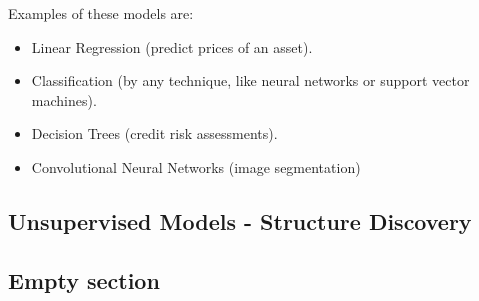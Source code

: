 Examples of these models are:
\begin{itemize}
    \item Linear Regression (predict prices of an asset).
    \item Classification (by any technique, like neural networks or support vector machines).
    \item Decision Trees (credit risk assessments).
    \item Convolutional Neural Networks (image segmentation)
\end{itemize}

\subsection{Unsupervised Models - Structure Discovery}



\subsection{Empty section}


